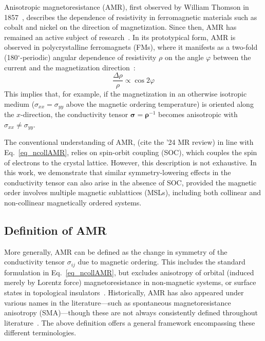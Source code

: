 \documentclass[prb,showpacs,amsmath,amssymb,superscriptaddress,twocolumn,floatfix]{revtex4-1}
\begin{document}
Anisotropic magnetoresistance (AMR), first observed by William Thomson in 1857~\cite{Thomson:1857}, describes the dependence of resistivity in ferromagnetic materials such as cobalt and nickel on the direction of magnetization. Since then, AMR has remained an active subject of research~\cite{Ritzinger:2023}. In its {\color{blue} prototypical} form, AMR is observed in {\color{blue} polycrystalline} ferromagnets (FMs), where it manifests as a two-fold (180$^\circ$-periodic) angular dependence of resistivity $\rho$ on the angle $\varphi$ between the current and the magnetization direction~\cite{Alagoz:2015}:
%
\begin{equation}
	\frac{\Delta \rho}{\rho} \propto \cos 2\varphi
	\label{eq_ncollAMR}
\end{equation}
%
This implies that, for example, if the magnetization in an otherwise isotropic medium ($\sigma_{xx} = \sigma_{yy}$ above the magnetic ordering temperature) is oriented along the $x$-direction, the conductivity tensor $\boldsymbol{\sigma} = \boldsymbol{\rho}^{-1}$ becomes anisotropic with $\sigma_{xx} \neq \sigma_{yy}$.

The conventional understanding of AMR, ({\color{red}cite the '24 MR review}) in line with Eq.~\ref{eq_ncollAMR}, relies on spin-orbit coupling (SOC), which couples the spin of electrons to the crystal lattice. However, this description is not exhaustive. In this work, we demonstrate that similar symmetry-lowering effects in the conductivity tensor can also arise in the absence of SOC, provided the magnetic order involves multiple magnetic sublattices (MSLs), including both collinear and non-collinear magnetically ordered systems.

\subsection{Definition of AMR}

More generally, AMR can be defined as the change in symmetry of the conductivity tensor $\sigma_{ij}$ due to magnetic ordering. This includes the standard formulation in Eq.~\ref{eq_ncollAMR}, but excludes anisotropy of orbital (induced merely by Lorentz force) magnetoresistance in non-magnetic systems, or surface states in topological insulators~\cite{Ritzinger:2023}. Historically, AMR has also appeared under various names in the literature—such as spontaneous magnetoresistance anisotropy (SMA)—though these are not always consistently defined throughout literature~\cite{Ritzinger:2023}. The above definition offers a general framework encompassing these different terminologies.
\end{document}
